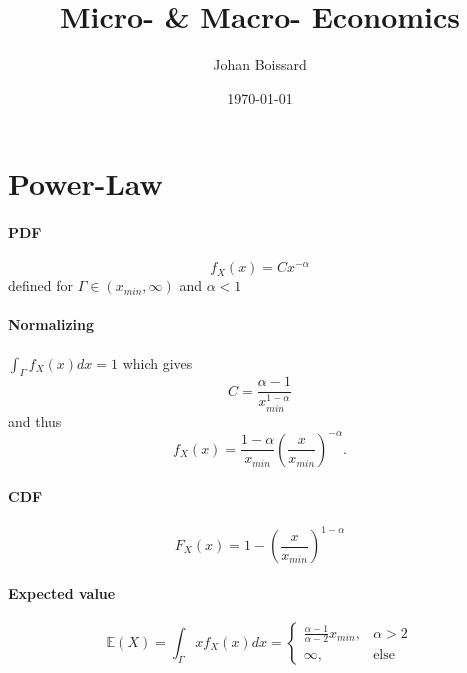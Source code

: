 \documentclass[a4paper,titlepage] {scrartcl}
\author{Johan Boissard}
\date{\today}
\title{Micro- \& Macro- Economics}
\begin{document}

\section{Power-Law} %
\label{sec:power_law}

\paragraph{PDF} %
\label{par:pdf}

\begin{equation}
	f_X(x) = Cx^{-\alpha}
\end{equation}
defined for $\Gamma\in(x_{min}, \infty)$ and $\alpha<1$




\paragraph{Normalizing} %
\label{par:normalizing}
$\int_{\Gamma} f_X(x)dx=1$ which gives
\begin{equation}
	C = \frac{\alpha-1}{x_{min}^{1-\alpha}}
\end{equation}
and thus
\begin{equation}
	f_X(x)= \frac{1-\alpha}{x_{min}}\left(\frac{x}{x_{min}}\right)^{-\alpha}.
\end{equation}

\paragraph{CDF} %
\label{par:cdf}
\begin{equation}
	F_X(x) = 1 - \left(\frac{x}{x_{min}}\right)^{1-\alpha}
\end{equation}

\paragraph{Expected value} %
\label{par:expected_value}
\begin{equation}
	\mathbb E(X) = \int_\Gamma xf_X(x)dx =
	\begin{cases}
		\frac{\alpha-1}{\alpha-2}x_{min},& \alpha>2\\
		\infty, & \text{else}
	\end{cases}
\end{equation}
\end{document}
